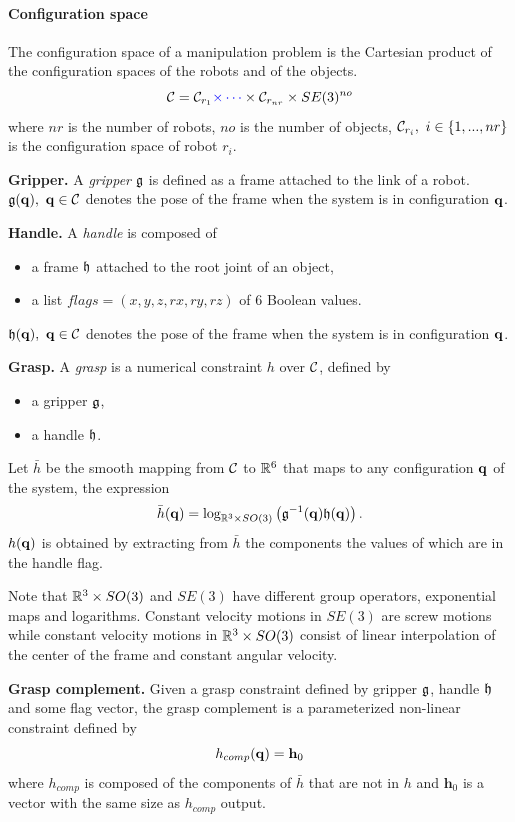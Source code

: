 \paragraph{Configuration space} The configuration space of a manipulation problem is the Cartesian product of the configuration spaces of the robots and of the objects.
$$
\mathcal{C} = \mathcal{C}_{r_1}{\color{blue}\times\cdots}\times\mathcal{C}_{r_{nr}}\times SE(3)^{no}
$$
where $nr$ is the number of robots, $no$ is the number of objects, $\CS_{r_i},\ i\in\{1,...,nr\}$ is the configuration space of robot $r_i$.
\begin{definition}\textbf{Gripper.}\label{def:gripper}
  A \emph{gripper} $\mathfrak{g}$ is defined as a frame attached to the link of a robot. $\gripper(\conf),\ \conf\in\CS$ denotes the pose of the frame when the system is in configuration $\mathbf{q}$.
\end{definition}
\begin{definition}\textbf{Handle.}\label{def:handle}
  A \emph{handle} is composed of
  \begin{itemize}
  \item a frame $\mathfrak{h}$ attached to the root joint of an object,
  \item a list $flags=(x,y,z,rx,ry,rz)$ of 6 Boolean values.
  \end{itemize}
  $\mathfrak{h}(\mathbf{q}),\ \mathbf{q}\in\mathcal{C}$ denotes the pose of the frame when the system is in configuration $\mathbf{q}$.
\end{definition}
\begin{definition}\textbf{Grasp.}\label{def:grasp}
  A \emph{grasp} is a numerical constraint $h$ over $\mathcal{C}$, defined by
  \begin{itemize}
  \item a gripper $\mathfrak{g}$,
  \item a handle $\mathfrak{h}$.
  \end{itemize}
  Let $\bar{h}$ be the smooth mapping from $\mathcal{C}$ to $\mathbb{R}^6$ that maps to any configuration $\mathbf{q}$ of the system, the expression
  \begin{equation}\label{eq:barh}
    \bar{h}(\conf) = \log_{\reals^3\times SO(3)}\left(\gripper^{-1}(\conf) \handle(\conf)\right).
  \end{equation}
  $h(\mathbf{q})$ is obtained by extracting from $\bar{h}$ the components the values of which are \true in the handle flag.
\end{definition}
    {\color{blue}Note that $\mathbb{R}^3\times SO(3)$ and $SE(3)$ have
      different group operators, exponential maps and
      logarithms. Constant velocity motions in $SE(3)$ are screw
      motions while constant velocity motions in $\mathbb{R}^3\times
      SO(3)$ consist of linear interpolation of the center of the
      frame and constant angular velocity.}
\begin{definition}\textbf{Grasp complement.}
  Given a grasp constraint defined by gripper $\mathfrak{g}$, handle $\mathfrak{h}$ and some flag vector, the grasp complement is a parameterized non-linear constraint defined by
  $$
  h_{comp}(\mathbf{q}) = \mathbf{h}_0
  $$
  where $h_{comp}$ is composed of the components of $\bar{h}$ that are not in $h$ and $\mathbf{h}_0$ is a vector with the same size as $h_{comp}$ output.
\end{definition}

